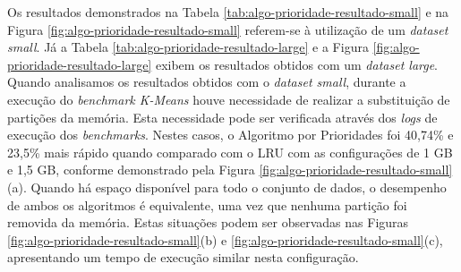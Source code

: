 Os resultados demonstrados na Tabela \ref{tab:algo-prioridade-resultado-small} e na Figura \ref{fig:algo-prioridade-resultado-small} referem-se à utilização de um \textit{dataset small}. Já a Tabela \ref{tab:algo-prioridade-resultado-large} e a Figura  \ref{fig:algo-prioridade-resultado-large} exibem os resultados obtidos com um \textit{dataset large}. Quando analisamos os resultados obtidos com o \textit{dataset small}, durante a execução do \textit{benchmark K-Means} houve necessidade de realizar a substituição de partições da memória. Esta necessidade pode ser verificada através dos \textit{logs} de execução dos \textit{benchmarks}. Nestes casos, o Algoritmo por Prioridades foi 40,74\% e 23,5\% mais rápido quando comparado com o LRU com as configurações de 1 GB e 1,5 GB, conforme demonstrado pela Figura \ref{fig:algo-prioridade-resultado-small}(a). Quando há espaço disponível para todo o conjunto de dados, o desempenho de ambos os algoritmos é equivalente, uma vez que nenhuma partição foi removida da memória. Estas situações podem ser observadas nas Figuras \ref{fig:algo-prioridade-resultado-small}(b) e \ref{fig:algo-prioridade-resultado-small}(c), apresentando um tempo de execução similar nesta configuração.



